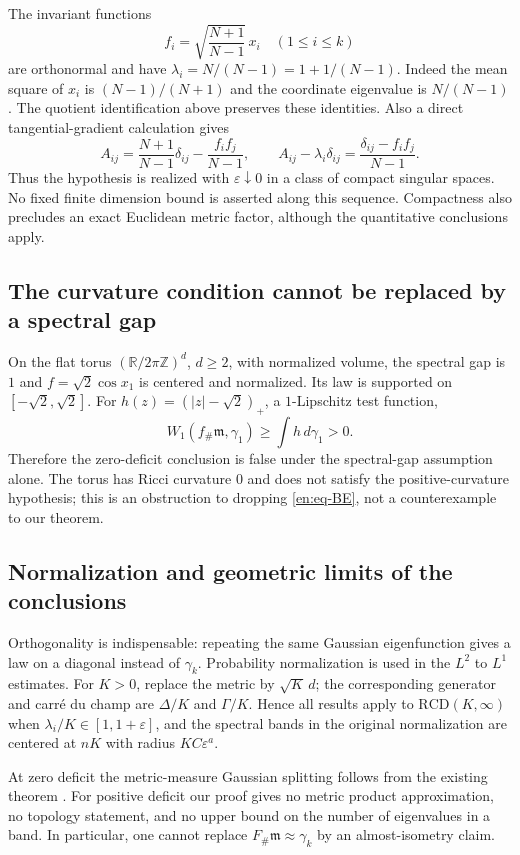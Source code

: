 \documentclass[12pt]{amsart}
\theoremstyle{definition}
\theoremstyle{remark}
\numberwithin{equation}{section}
\newcommand{\R}{\mathbb{R}}
\newcommand{\Z}{\mathbb{Z}}
\newcommand{\m}{\mathfrak m}
\newcommand{\RCD}{\mathrm{RCD}}
\theoremstyle{jpplain}
\begin{document}
The invariant functions
\[
 f_i=\sqrt{\frac{N+1}{N-1}}\,x_i
 \quad(1\leq i\leq k)
\]
are orthonormal and have
$\lambda_i=N/(N-1)=1+1/(N-1)$.
Indeed the mean square of $x_i$ is $(N-1)/(N+1)$ and the coordinate
eigenvalue is $N/(N-1)$.  The quotient identification above preserves
these identities.  Also a direct tangential-gradient calculation gives
\[
 A_{ij}=\frac{N+1}{N-1}\delta_{ij}-\frac{f_i f_j}{N-1},
 \qquad
 A_{ij}-\lambda_i\delta_{ij}
 =\frac{\delta_{ij}-f_i f_j}{N-1}.
\]
Thus the hypothesis is realized with $\varepsilon\downarrow0$ in a
class of compact singular spaces.  No fixed finite dimension bound is
asserted along this sequence.  Compactness also precludes an exact
Euclidean metric factor, although the quantitative conclusions apply.

\subsection{The curvature condition cannot be replaced by a spectral gap}
On the flat torus $(\R/2\pi\Z)^d$, $d\geq2$, with normalized volume,
the spectral gap is $1$ and $f=\sqrt2\cos x_1$ is centered and normalized.
Its law is supported on $[-\sqrt2,\sqrt2]$.  For
$h(z)=(|z|-\sqrt2)_+$, a $1$-Lipschitz test function,
\[
 W_1(f_\#\m,\gamma_1)\geq\int h\,d\gamma_1>0.
\]
Therefore the zero-deficit conclusion is false under the spectral-gap
assumption alone.  The torus has Ricci curvature $0$ and does not satisfy
the positive-curvature hypothesis; this is an obstruction to dropping
\eqref{en:eq-BE}, not a counterexample to our theorem.

\subsection{Normalization and geometric limits of the conclusions}
Orthogonality is indispensable: repeating the same Gaussian eigenfunction
gives a law on a diagonal instead of $\gamma_k$.  Probability normalization
is used in the $L^2$ to $L^1$ estimates.  For $K>0$, replace the metric by
$\sqrt K\,d$; the corresponding generator and carré du champ are
$\Delta/K$ and $\Gamma/K$.  Hence all results apply to
$\RCD(K,\infty)$ when $\lambda_i/K\in[1,1+\varepsilon]$, and the
spectral bands in the original normalization are centered at $nK$ with
radius $KC\varepsilon^a$.

At zero deficit the metric-measure Gaussian splitting follows from the
existing theorem \cite[Theorem 1.1]{en:GKKO}.  For positive deficit our
proof gives no metric product approximation, no topology statement, and
no upper bound on the number of eigenvalues in a band.  In particular,
one cannot replace $F_\#\m\approx\gamma_k$ by an almost-isometry claim.
\end{document}
